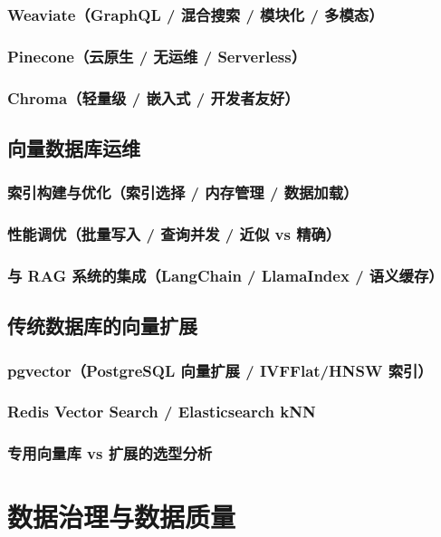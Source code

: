 \documentclass[12pt,UTF8]{ctexbook}
\begin{document}
    \subsection{Weaviate（GraphQL / 混合搜索 / 模块化 / 多模态）}
    \subsection{Pinecone（云原生 / 无运维 / Serverless）}
    \subsection{Chroma（轻量级 / 嵌入式 / 开发者友好）}

  \section{向量数据库运维}
    \subsection{索引构建与优化（索引选择 / 内存管理 / 数据加载）}
    \subsection{性能调优（批量写入 / 查询并发 / 近似 vs 精确）}
    \subsection{与 RAG 系统的集成（LangChain / LlamaIndex / 语义缓存）}

  \section{传统数据库的向量扩展}
    \subsection{pgvector（PostgreSQL 向量扩展 / IVFFlat/HNSW 索引）}
    \subsection{Redis Vector Search / Elasticsearch kNN}
    \subsection{专用向量库 vs 扩展的选型分析}


\chapter{数据治理与数据质量}
\label{chap:data-governance}
\end{document}
